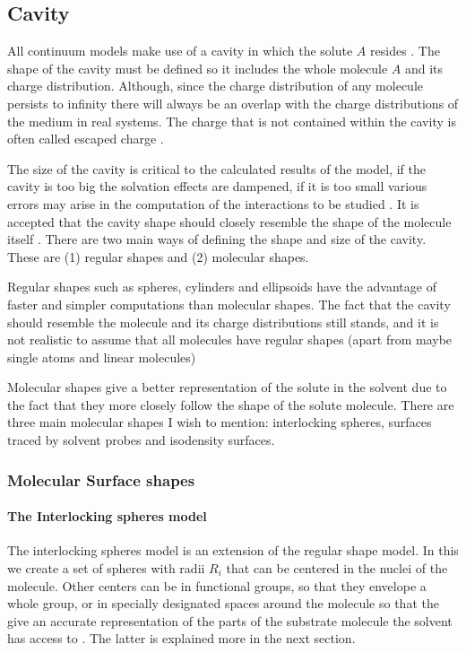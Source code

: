 \documentclass[../master_thesis.tex]{subfiles}
\begin{document}
\subsection{Cavity}\label{Cavitytitle}
All continuum models make use of a cavity in which the solute $A$ resides
\cite{Tomasi:1994wt, Cramer:2004, Tomasi:2005ipa}. The shape of the cavity
must be defined so it includes the whole molecule $A$ and its charge distribution.
Although, since the charge distribution of any molecule persists to infinity there
will always be an overlap with the charge distributions of the medium in real
systems. The charge that is not contained within the cavity is often called
escaped charge \cite{Tomasi:2005ipa}.

The size of the cavity is critical to the calculated results of the model, if
the cavity is too big the solvation effects are dampened, if it is too small
various errors may arise in the computation of the interactions to be studied
\cite{Tomasi:1994wt}. It is accepted that the cavity shape should closely
resemble the shape of the molecule itself \cite{Tomasi:2005ipa}. There are two
main ways of defining the shape and size of the cavity. These are (1) regular
shapes and (2) molecular shapes.

Regular shapes such as spheres, cylinders and ellipsoids have the advantage of
faster and simpler computations than molecular shapes. The fact that the cavity
should resemble the molecule and its charge distributions still stands, and it
is not realistic to assume that all molecules have regular shapes (apart from
maybe single atoms and linear molecules) \cite{Tomasi:2005ipa}

Molecular shapes give a better representation of the solute in the solvent due
to the fact that they more closely follow the shape of the solute molecule.
There are three main molecular shapes I wish to mention:
interlocking spheres, surfaces traced by solvent probes and isodensity surfaces.

\subsubsection{Molecular Surface shapes}

\paragraph{The Interlocking spheres model}
The interlocking spheres model is an extension of the regular shape model. In
this we create a set of spheres with radii $R_i$ that can be centered in the
nuclei of the molecule. Other centers can be in functional groups, so that they envelope a whole group,
or in specially designated spaces around the molecule so that the give an accurate
representation of the parts of the substrate molecule the solvent has access to
\cite{Tomasi:1994wt}. The latter is explained more in the next section.
\end{document}
